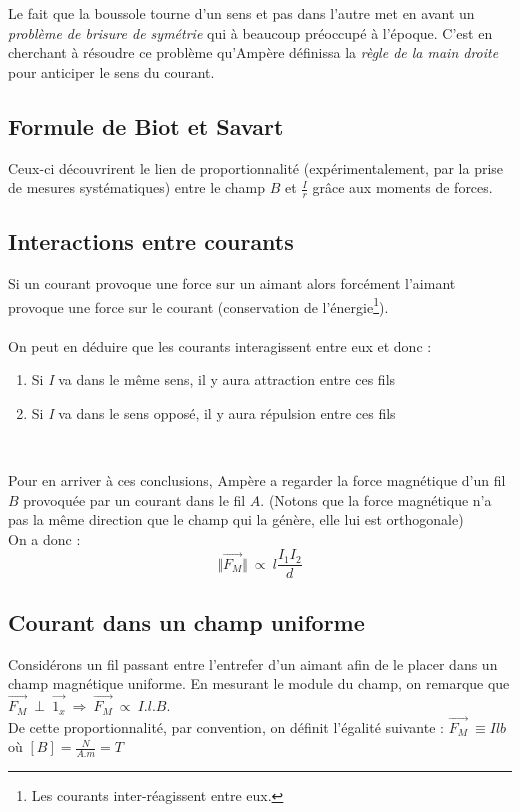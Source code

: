 \documentclass	[11pt, a4paper, openany]{book}
\begin{document}
Le fait que la boussole tourne d'un sens et pas dans l'autre met en avant un \textit{problème de brisure de symétrie} qui à beaucoup préoccupé à l'époque. C'est en cherchant à résoudre ce problème qu'Ampère définissa la \textit{règle de la main droite} pour anticiper le sens du courant.

\subsection{Formule de Biot et Savart}
Ceux-ci découvrirent le lien de proportionnalité (expérimentalement, par la prise de mesures systématiques) entre le champ $B$ et $\frac{I}{r}$ grâce aux moments de forces.

\subsection{Interactions entre courants}
Si un courant provoque une force sur un aimant alors forcément l'aimant provoque une force sur le courant (conservation de l'énergie\footnote{Les courants inter-réagissent entre eux.}).\\\\
On peut en déduire que les courants interagissent entre eux et donc :
\begin{enumerate}
\item Si \textit{I} va dans le même sens, il y aura attraction entre ces fils
\item Si \textit{I} va dans le sens opposé, il y aura répulsion entre ces fils
\end{enumerate}
\ 


Pour en arriver à ces conclusions, Ampère a regarder la force magnétique d'un fil $B$ provoquée par un courant dans le fil $A$. (Notons que la force magnétique n'a pas la même direction que le champ qui la génère, elle lui est orthogonale)
\\
On a donc :
\begin{equation}
\Vert \vec{F_M} \Vert\ \propto\ l \frac{I_1 I_2}{d}
\end{equation}

\subsection{Courant dans un champ uniforme}
Considérons un fil passant entre l'entrefer d'un aimant afin de le placer dans un champ magnétique uniforme. En mesurant le module du champ, on remarque que $\vec{F_M}\ \perp\ \vec{1_x}\ \Rightarrow\ \vec{F_M}\ \propto\ I.l.B$.\\
De cette proportionnalité, par convention, on définit l'égalité suivante : $ \vec{F_M}\ \equiv Ilb$ où $[B] = \frac{N}{A.m} = T$\\
\end{document}
